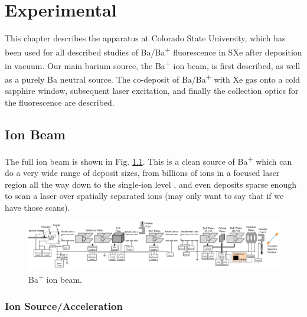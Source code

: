 \chapter{Experimental}

This chapter describes the apparatus at Colorado State University, which has been used for all described studies of Ba/Ba\textsuperscript{+} fluorescence in SXe after deposition in vacuum.  Our main barium source, the Ba\textsuperscript{+} ion beam, is first described, as well as a purely Ba neutral source.  The co-deposit of Ba/Ba\textsuperscript{+} with Xe gas onto a cold sapphire window, subsequent laser excitation, and finally the collection optics for the fluorescence are described.

\section{Ion Beam}

The full ion beam is shown in Fig. \ref{fig:ionbeam}.  This is a clean source of Ba\textsuperscript{+} which can do a very wide range of deposit sizes, from billions of ions in a focused laser region all the way down to the single-ion level {\color{gray}, and even deposits sparse enough to scan a laser over spatially separated ions (may only want to say that if we have those scans)}.

\begin{figure} %
        \centering
                \includegraphics[angle=90,width=.25\textwidth]{figures/ionBeam.png}
                \caption{Ba\textsuperscript{+} ion beam.}
\label{fig:ionbeam}
\end{figure}

\subsection{Ion Source/Acceleration}

